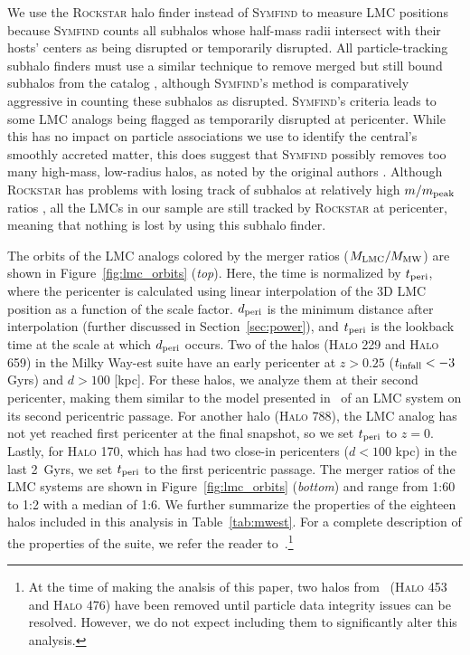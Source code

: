 \documentclass[twocolumn, linenumbers]{openjournal}
\begin{document}
We use the \textsc{Rockstar} halo finder instead of \textsc{Symfind} to measure 
LMC positions because \textsc{Symfind} counts all subhalos whose half-mass radii intersect 
with their hosts' centers as being disrupted or temporarily disrupted. All particle-tracking 
subhalo finders must use a similar technique to remove merged but still bound subhalos from 
the catalog \citep{han_2018,diemer_2023}, although \textsc{Symfind}'s method is comparatively 
aggressive in counting these subhalos as disrupted. \textsc{Symfind}'s criteria leads to some 
LMC analogs being flagged as temporarily disrupted at pericenter. While this has no impact on 
particle associations we use to identify the central's smoothly accreted matter, this does 
suggest that \textsc{Symfind} possibly removes too many high-mass, low-radius halos, as noted 
by the original authors \citep{mansfield2023symfind}. Although \textsc{Rockstar} has problems 
with losing track of subhalos at relatively high $m/m_{\rm peak}$ ratios \citep{mansfield2023symfind}, 
all the LMCs in our sample are still tracked by \textsc{Rockstar} at pericenter, meaning that 
nothing is lost by using this subhalo finder.

The orbits of the LMC analogs colored by the merger ratios ($M_{\rm LMC}/M_{\rm MW}$) 
are shown in Figure~\ref{fig:lmc_orbits} (\emph{top}). Here, the time is normalized by $t_{\rm peri}$, 
where the pericenter is calculated using linear interpolation of the 3D LMC position as a function of 
the scale factor. $d_{\rm peri}$ is the minimum distance after interpolation (further discussed in 
Section~\ref{sec:power}), and $t_{\rm peri}$ is the lookback time at the scale at which $d_{\rm peri}$ 
occurs. Two of the halos (\textsc{Halo 229} and \textsc{Halo 659}) in the Milky Way-est suite have an early pericenter 
at $z > 0.25$ ($t_{\rm infall} < -3$ Gyrs) and $d > 100$ [kpc]. For these halos, we analyze them at 
their second pericenter, making them similar to the model presented in~\cite{vasiliev2023dear} of an 
LMC system on its second pericentric passage. For another halo (\textsc{Halo 788}), the LMC analog has not yet 
reached first pericenter at the final snapshot, so we set $t_{\rm peri}$ to $z=0$. Lastly, for \textsc{Halo 170}, 
which has had two close-in pericenters ($d < 100$ kpc) in the last 2~Gyrs, we set $t_{\rm peri}$ to 
the first pericentric passage. The merger ratios of the LMC systems are shown in 
Figure~\ref{fig:lmc_orbits} (\emph{bottom}) and range from 1:60 to 1:2 with a median of 1:6. We 
further summarize the properties of the eighteen halos included in this analysis in Table~\ref{tab:mwest}. 
For a complete description of the properties of the suite, we refer 
the reader to~\cite{buch2024milky}.\footnote{At the time of making the analsis of this paper, 
two halos from~\cite{buch2024milky} (\textsc{Halo 453} and \textsc{Halo 476}) have been removed until particle data integrity issues can be resolved. However, we do not expect 
including them to significantly alter this analysis.}
\end{document}
